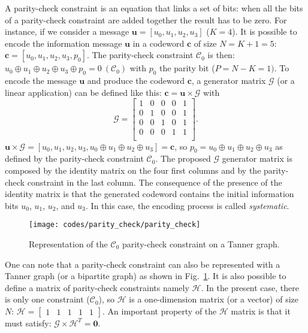 A parity-check constraint is an equation that links a set of bits: when all the
bits of a parity-check constraint are added together the result has to be
zero. For instance, if we consider a message $\bm{u} = [u_0, u_1, u_2, u_3]$
($K = 4$). It is possible to encode the information message $\bm{u}$ in a
codeword $\bm{c}$ of size $N = K + 1 = 5$: $\bm{c} = [u_0,u_1,u_2,u_3,p_0]$.
The parity-check constraint $\mathcal{C}_0$ is then: $u_0 \oplus u_1 \oplus u_2
\oplus u_3 \oplus p_0 = 0~(\mathcal{C}_0)$ with $p_0$ the parity bit ($P = N -
K = 1)$. To encode the message $\bm{u}$ and produce the codeword $\bm{c}$, a
generator matrix $\bm{\mathcal{G}}$ (or a linear application) can be defined
like this: $\bm{c} = \bm{u} \times \bm{\mathcal{G}}$ with
\begin{equation*}
\bm{\mathcal{G}} =
\begin{bmatrix}
1 & 0 & 0 & 0 & 1\\
0 & 1 & 0 & 0 & 1\\
0 & 0 & 1 & 0 & 1\\
0 & 0 & 0 & 1 & 1\\
\end{bmatrix}
.
\end{equation*}
$\bm{u} \times \bm{\mathcal{G}} = [u_0,u_1,u_2,u_3,u_0 \oplus u_1 \oplus u_2
\oplus u_3] = \bm{c}$, so $p_0 = u_0 \oplus u_1 \oplus u_2 \oplus u_3$ as
defined by the parity-check constraint $\mathcal{C}_0$. The proposed
$\bm{\mathcal{G}}$ generator matrix is composed by the identity matrix on the
four first columns and by the parity-check constraint in the last column.
The consequence of the presence of the identity matrix is that the generated
codeword contains the initial information bits $u_0$, $u_1$, $u_2$, and $u_3$.
In this case, the encoding process is called \emph{systematic}.

\begin{figure}[htp]
  \centering
  \texttt{[image: codes/parity\_check/parity\_check]}
  \caption{Representation of the $\mathcal{C}_0$ parity-check constraint on a
    Tanner graph.}
  \label{fig:ctx_codes_parity_check}
\end{figure}
One can note that a parity-check constraint can also be represented with a
Tanner graph (or a bipartite graph) as shown in
Fig.~\ref{fig:ctx_codes_parity_check}. It is also possible to define a matrix of
parity-check constraints namely $\bm{\mathcal{H}}$. In the present case, there
is only one constraint ($\mathcal{C}_0$), so $\bm{\mathcal{H}}$ is a
one-dimension matrix (or a vector) of size $N$:
$
\bm{\mathcal{H}} =
\begin{bmatrix}
1 & 1 & 1 & 1 & 1
\end{bmatrix}.
$
An important property of the $\bm{\mathcal{H}}$ matrix is that it must satisfy:
$\bm{\mathcal{G}} \times \bm{\mathcal{H}}^T = \bm{0}.$

